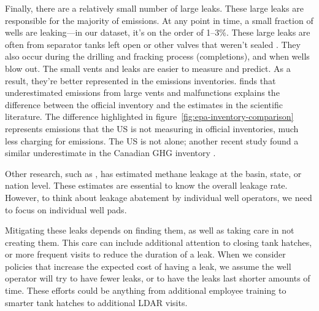 \documentclass[12pt,oneside,letterpaper]{article}
\theoremstyle{definition}
\begin{document}
\begin{refsection}
Finally, there are a relatively small number of large leaks.
These large leaks are responsible for the majority of emissions.
At any point in time, a small fraction of wells are leaking---in our dataset, it's on the order of 1--3\%.
These large leaks are often from separator tanks left open or other valves that weren't sealed
\parencite{Lyon/Alvarez/Zavala-Araiza/Brandt/Jackson/Hamburg:2016}.
They also occur during the drilling and fracking process (completions), and when wells blow out.
The small vents and leaks are easier to measure and predict.
As a result, they're better represented in the emissions inventories.
\textcite{Rutherford/etal:2021} finds that underestimated emissions from large vents and malfunctions explains the difference between the official inventory and the estimates in the scientific literature.
The difference highlighted in figure~\ref{fig:epa-inventory-comparison}  represents emissions that the US is not measuring in official inventories, much less charging for emissions.
The US is not alone; another recent study found a similar underestimate in the Canadian \gls{GHG} inventory \parencite{Chan/Worthy/Chan/Ishizawa/Moran/Delcloo/Vogel:2020}.


Other research, such as \textcite{Alvarez/etal:2018}, has estimated methane leakage at the basin, state, or nation level.
These estimates are essential to know the overall leakage rate.
However, to think about leakage abatement by individual well operators, we need to focus on individual well pads.

Mitigating these leaks depends on finding them, as well as taking care in not creating them.
This care can include additional attention to closing tank hatches, or more frequent visits to reduce the duration of a leak.
When we consider policies that increase the expected cost of having a leak, we assume the well operator will try to have fewer leaks, or to have the leaks last shorter amounts of time.
These efforts could be anything from additional employee training to smarter tank hatches to additional \gls{LDAR} visits.


\end{refsection}
\end{document}
